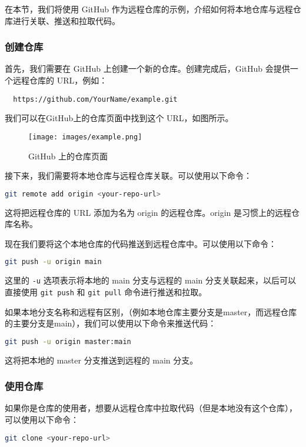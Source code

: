 \documentclass[../main.tex]{subfiles}
\begin{document}
在本节，我们将使用 GitHub 作为远程仓库的示例，介绍如何将本地仓库与远程仓库进行关联、推送和拉取代码。

\subsubsection{创建仓库}
首先，我们需要在 GitHub 上创建一个新的仓库。创建完成后，GitHub 会提供一个远程仓库的 URL，例如：
\begin{lstlisting}
  https://github.com/YourName/example.git
\end{lstlisting}
我们可以在GitHub上的仓库页面中找到这个 URL，如图所示。

\begin{figure}[ht]
  \centering
  \texttt{[image: images/example.png]}
  \caption{GitHub 上的仓库页面}
  \label{fig:github-repo}
\end{figure}

接下来，我们需要将本地仓库与远程仓库关联。可以使用以下命令：
\begin{lstlisting}[language=bash]
git remote add origin <your-repo-url>
\end{lstlisting}
这将把远程仓库的 URL 添加为名为 origin 的远程仓库。origin 是习惯上的远程仓库名称。

现在我们要将这个本地仓库的代码推送到远程仓库中。可以使用以下命令：
\begin{lstlisting}[language=bash]
git push -u origin main
\end{lstlisting}
这里的 \texttt{-u} 选项表示将本地的 main 分支与远程的 main 分支关联起来，以后可以直接使用 \texttt{git push} 和 \texttt{git pull} 命令进行推送和拉取。

如果本地分支名称和远程有区别，（例如本地仓库主要分支是master，而远程仓库的主要分支是main），我们可以使用以下命令来推送代码：
\begin{lstlisting}[language=bash]
git push -u origin master:main
\end{lstlisting}
这将把本地的 master 分支推送到远程的 main 分支。

\subsubsection{使用仓库}

如果你是仓库的使用者，想要从远程仓库中拉取代码（但是本地没有这个仓库），可以使用以下命令：

\begin{lstlisting}[language=bash]
git clone <your-repo-url>
\end{lstlisting}
\end{document}
